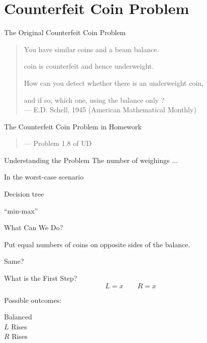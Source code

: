 \section{Counterfeit Coin Problem}

\begin{frame}{The Original Counterfeit Coin Problem}
  \begin{quote}
    You have  similar coins and a beam balance.

     coin is counterfeit and hence underweight.

    How can you detect whether there is an underweight coin, 

    and if so, which one, using the balance only ? \\[8pt]

    \hfill --- E.D. Schell, 1945 (American Mathematical Monthly)
  \end{quote}
\end{frame}

\begin{frame}{The Counterfeit Coin Problem in Homework}
  \begin{quote}

    \hfill --- Problem 1.8 of UD
  \end{quote}
\end{frame}

\begin{frame}{Understanding the Problem}
  The  number of weighings $\dots$

  In the worst-case scenario

  Decision tree

  ``min-max''
\end{frame}

\begin{frame}{What Can We Do?}
  \centerline{Put equal numbers of coins on opposite sides of the balance.}

  Same?
\end{frame}

\begin{frame}{What is the First Step?}
  \[
    L = x \qquad R = x
  \]

  Possible outcomes:
  \begin{description}
    \item[Balanced]
    \item[$L$ Rises]
    \item[$R$ Rises]
  \end{description}
\end{frame}

